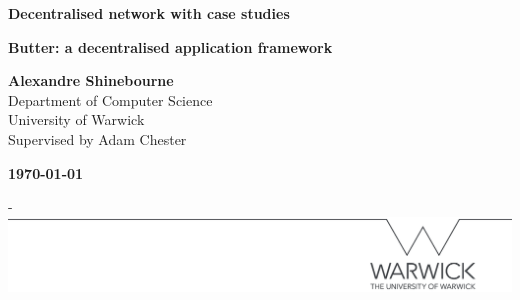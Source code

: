 \begin{titlepage}

    {\parindent0cm

    \textbf{\Huge Decentralised network with case studies}

    \vspace*{0.5cm}

    \textbf{\huge Butter: a decentralised application framework}

    \vspace*{1.2cm}

    {\Large
        \textbf{Alexandre Shinebourne}\\
        Department of Computer Science\\
        University of Warwick
    }\\

    {\Large Supervised by Adam Chester} \\

    \vfill

    {\Large \textbf{\today}}

    \begin{adjustwidth}{-15mm}{-\rightmargin}
        \centering
        \includegraphics[width=\paperwidth]{titlepage/line.png}
    \end{adjustwidth}

    \vspace*{-3cm}
    }
    \restoregeometry


\end{titlepage}
